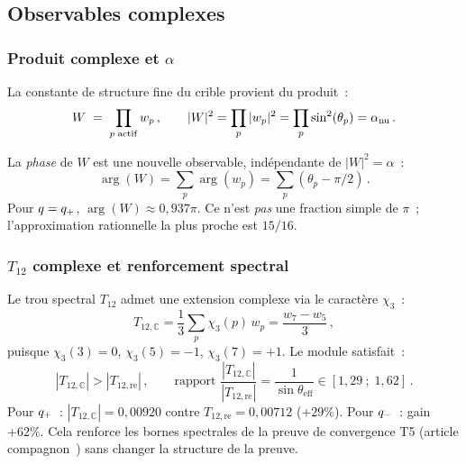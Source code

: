 \documentclass[12pt,a4paper]{article}
\begin{document}
\subsection{Observables complexes}
\label{sec:cx_observables}

\subsubsection{Produit complexe et \texorpdfstring{$\alpha$}{alpha}}

La constante de structure fine du crible provient du produit~:
\begin{equation}
  W \;=\; \prod_{p\;\mathrm{actif}} w_p\,,\qquad
  |W|^2 = \prod_{p} |w_p|^2 = \prod_{p} \sin^2(\theta_{p}) = \alpha_{\mathrm{nu}}\,.
  \label{eq:W_product}
\end{equation}

La \emph{phase} de $W$ est une nouvelle observable, indépendante de
$|W|^2 = \alpha$~:
\begin{equation}
  \arg(W) = \sum_p \arg(w_p) = \sum_p (\theta_p - \pi/2)\,.
  \label{eq:argW}
\end{equation}
Pour $q = q_{+}$, $\arg(W) \approx 0{,}937\pi$.
Ce n'est \emph{pas} une fraction simple de $\pi$~; l'approximation
rationnelle la plus proche est $15/16$.

\subsubsection{\texorpdfstring{$T_{12}$}{T12} complexe et renforcement spectral}
\label{subsec:cx_T12}

Le trou spectral $T_{12}$ admet une extension complexe via le
caractère $\chi_3$~:
\begin{equation}
  T_{12,\mathbb{C}} = \frac{1}{3}\sum_p \chi_3(p)\, w_p
  = \frac{w_7 - w_5}{3}\,,
  \label{eq:T12C}
\end{equation}
puisque $\chi_3(3) = 0$, $\chi_3(5) = -1$, $\chi_3(7) = +1$. Le
module satisfait~:
\[
  |T_{12,\mathbb{C}}| > |T_{12,\mathrm{re}}|\,,\qquad
  \text{rapport } \frac{|T_{12,\mathbb{C}}|}{|T_{12,\mathrm{re}}|}
  = \frac{1}{\sin\theta_{\mathrm{eff}}} \in [1{,}29~;\; 1{,}62]\,.
\]
Pour $q_{+}$~: $|T_{12,\mathbb{C}}| = 0{,}00920$ contre
$T_{12,\mathrm{re}} = 0{,}00712$ ($+29\%$).
Pour $q_{-}$~: gain $+62\%$.
Cela renforce les bornes spectrales de la preuve de convergence T5
(article compagnon~\cite{companion_M3}) sans changer la structure de
la preuve.
\end{document}
